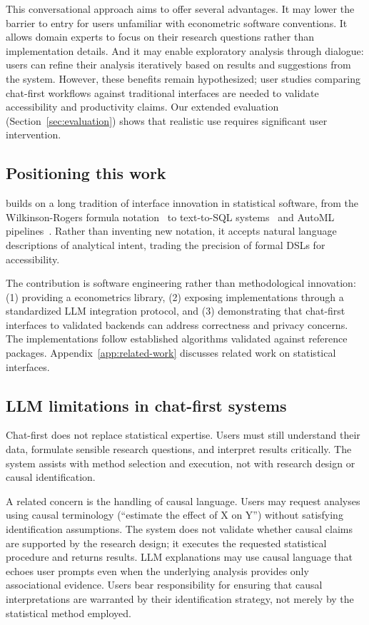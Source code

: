 This conversational approach aims to offer several advantages. It may lower the
barrier to entry for users unfamiliar with econometric software conventions. It
allows domain experts to focus on their research questions rather than
implementation details. And it may enable exploratory analysis through
dialogue: users can refine their analysis iteratively based on results
and suggestions from the system. However, these benefits remain hypothesized;
user studies comparing chat-first workflows against traditional interfaces
are needed to validate accessibility and productivity claims. Our extended
evaluation (Section~\ref{sec:evaluation}) shows that realistic use requires
significant user intervention.

\subsection{Positioning this work}

 builds on a long tradition of interface innovation in
statistical software, from the Wilkinson-Rogers formula
notation~\citep{Wilkinson+Rogers:1973} to text-to-SQL systems~\citep{Yu+etal:2018} and
AutoML pipelines~\citep{Feurer+etal:2015}. Rather than inventing new notation,
it accepts natural language descriptions of analytical intent, trading the
precision of formal DSLs for accessibility.

The contribution is software engineering rather than methodological
innovation: (1) providing a  econometrics library,
(2) exposing implementations through a standardized LLM integration protocol,
and (3) demonstrating that chat-first interfaces to validated backends can
address correctness and privacy concerns. The implementations follow established
algorithms validated against  reference packages.
Appendix~\ref{app:related-work} discusses related work on statistical interfaces.

\subsection{LLM limitations in chat-first systems}

Chat-first does not replace statistical expertise. Users
must still understand their data, formulate sensible research questions,
and interpret results critically. The system assists with method selection
and execution, not with research design or causal identification.

A related concern is the handling of causal language. Users may request
analyses using causal terminology (``estimate the effect of X on Y'')
without satisfying identification assumptions. The system does not
validate whether causal claims are supported by the research design;
it executes the requested statistical procedure and returns results.
LLM explanations may use causal language that echoes user prompts even
when the underlying analysis provides only associational evidence.
Users bear responsibility for ensuring that causal interpretations are
warranted by their identification strategy, not merely by the statistical
method employed.


